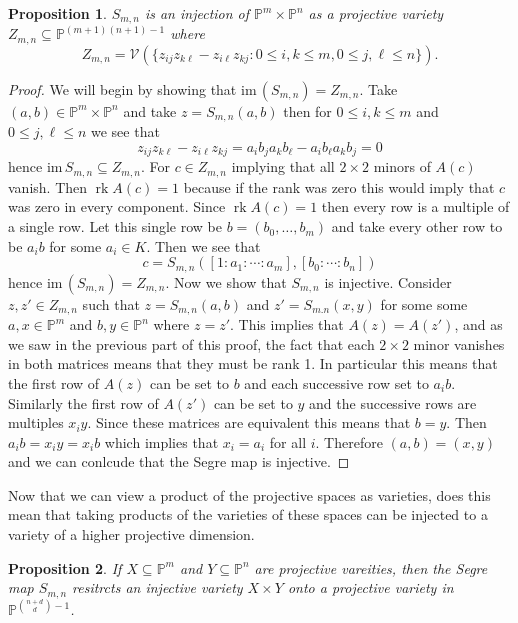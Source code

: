\documentclass[40pt]{article}
\newcommand{\Proj}{\mathbb{P}}
\newcommand{\V}{\mathcal{V}}
\newcommand{\im}{\text{im}\,}
\DeclareMathOperator{\rank}{\text{rk}}
\newtheorem{proposition}{Proposition}[section]
\theoremstyle{remark}
\begin{document}
			\begin{proposition}
				$S_{m,n}$ is an injection of $\Proj^m \times \Proj^n$ as a projective variety $Z_{m,n} \subseteq \Proj^{(m+1)(n+1)-1}$ where 
				\[
				Z_{m,n} = \V(\{z_{ij}z_{k\ell} - z_{i\ell}z_{kj} : 0 \leq i , k \leq m, 0 \leq j, \ell \leq n\}).
				\]
			\end{proposition}
			\begin{proof}
				We will begin by showing that $\im (S_{m,n}) = Z_{m,n}$. Take $(a,b) \in \Proj^m \times \Proj^n$ and take $z = S_{m,n}(a,b)$ then for $0 \leq i , k \leq m$ and $0 \leq j, \ell \leq n$ we see that 
				\[
				z_{ij}z_{k\ell} - z_{i\ell}z_{kj} = a_ib_ja_kb_\ell - a_ib_\ell a_k b_j = 0
				\]
				hence $\im S_{m,n} \subseteq Z_{m,n}$. For $c \in Z_{m,n}$ implying that all $2 \times 2$ minors of $A(c)$ vanish. Then $\rank A(c) = 1$ because if the rank was zero this would imply that $c$ was zero in every component. Since $\rank A(c) = 1$ then every row is a multiple of a single row. Let this single row be $b = (b_0,\dots,b_m)$ and take every other row to be $a_ib$ for some $a_i \in K$. Then we see that 
				\[
				c = S_{m,n}([1:a_1:\cdots:a_m], [b_0:\cdots:b_n])
				\]
				hence $\im (S_{m,n}) = Z_{m,n}$. Now we show that $S_{m,n}$ is injective. Consider $z, z' \in Z_{m,n}$ such that $z = S_{m,n}(a,b)$ and $z' = S_{m.n}(x,y)$ for some some $a,x \in \Proj^m$ and $b, y \in \Proj^n$ where $z = z'$. This implies that $A(z) = A(z')$, and as we saw in the previous part of this proof, the fact that each $2 \times 2$ minor vanishes in both matrices means that they must be rank 1. In particular this means that the first row of $A(z)$ can be set to $b$ and each successive row set to $a_ib$. Similarly the first row of $A(z')$ can be set to $y$ and the successive rows are multiples $x_iy$. Since these matrices are equivalent this means that $b = y$. Then $a_ib = x_iy = x_ib$ which implies that $x_i = a_i$ for all $i$. Therefore $(a,b) = (x,y)$ and we can conlcude that the Segre map is injective. 
			\end{proof}
			Now that we can view a product of the projective spaces as varieties, does this mean that taking products of the varieties of these spaces can be injected to a variety of a higher projective dimension. 
			\begin{proposition}
				If $X \subseteq \Proj^m$ and $Y \subseteq \Proj^n$ are projective vareities, then the Segre map $S_{m,n}$ resitrcts an injective variety $X \times Y$ onto a projective variety in $\Proj^{{n + d\choose d} - 1}$.
			\end{proposition}
\end{document}
